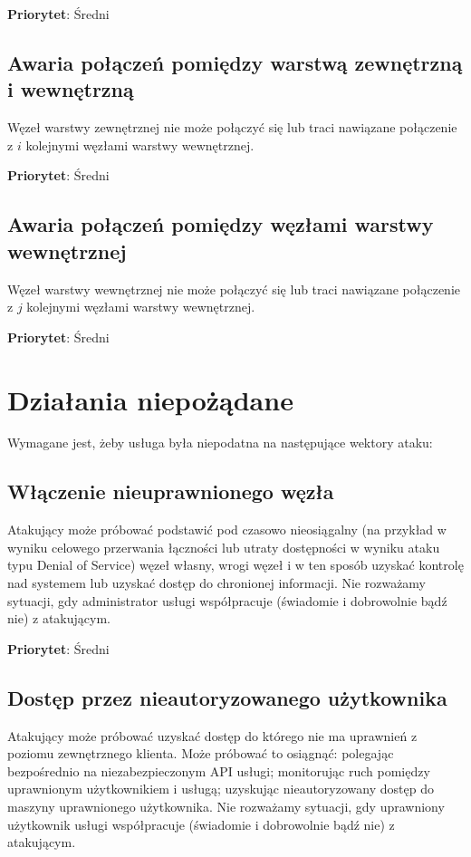 \documentclass[a4paper,11pt]{article}
\begin{document}
\textbf{Priorytet}: Średni

\subsection{Awaria połączeń pomiędzy warstwą zewnętrzną i wewnętrzną}
Węzeł warstwy zewnętrznej nie może połączyć się lub traci nawiązane
połączenie z $i$ kolejnymi węzłami warstwy wewnętrznej.

\textbf{Priorytet}: Średni

\subsection{Awaria połączeń pomiędzy węzłami warstwy wewnętrznej}
Węzeł warstwy wewnętrznej nie może połączyć się lub traci nawiązane
połączenie z $j$ kolejnymi węzłami warstwy wewnętrznej.

\textbf{Priorytet}: Średni


\section{Działania niepożądane}
\label{attackVectors}
Wymagane jest, żeby usługa była niepodatna na następujące wektory ataku:

\subsection{Włączenie nieuprawnionego węzła}
Atakujący może próbować podstawić pod czasowo nieosiągalny (na przykład
w wyniku celowego przerwania łączności lub utraty dostępności w wyniku
ataku typu Denial of Service) węzeł własny, wrogi węzeł i w ten sposób
uzyskać kontrolę nad systemem lub uzyskać dostęp do chronionej
informacji. Nie rozważamy sytuacji, gdy administrator usługi
współpracuje (świadomie i dobrowolnie bądź nie) z atakującym.

\textbf{Priorytet}: Średni

\subsection{Dostęp przez nieautoryzowanego użytkownika}
Atakujący może próbować uzyskać dostęp do którego nie ma uprawnień z
poziomu zewnętrznego klienta. Może próbować to osiągnąć: polegając
bezpośrednio na niezabezpieczonym API usługi; monitorując ruch pomiędzy
uprawnionym użytkownikiem i usługą; uzyskując nieautoryzowany dostęp do
maszyny uprawnionego użytkownika. Nie rozważamy sytuacji, gdy uprawniony
użytkownik usługi współpracuje (świadomie i dobrowolnie bądź nie) z
atakującym.
\end{document}
